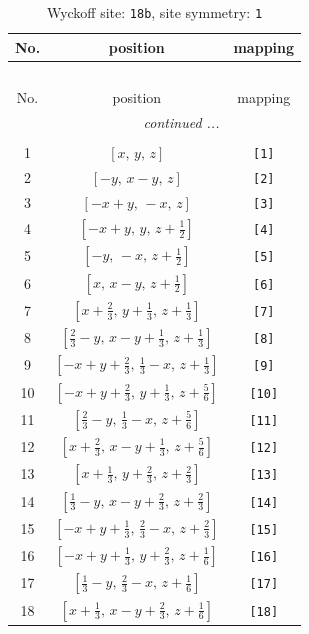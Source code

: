 \documentclass[fleqn,8pt]{jsarticle}
\begin{document}
\begin{longtable}{ccc}
\caption{Wyckoff site: {\tt 18b}, site symmetry: {\tt 1}}
 \\
 \hline \hline
No. & position & mapping \\ \hline \endfirsthead

\multicolumn{2}{l}{\tablename\ \thetable{}} \\
 \hline \hline
No. & position & mapping \\ \hline \endhead

 \hline \hline
\multicolumn{2}{r}{\footnotesize\it continued ...} \\ \endfoot

 \hline \hline
\multicolumn{2}{r}{} \\ \endlastfoot

1 & $\left[ x,\, y,\, z \right]$ & {\tt [1]} \\ \hline
2 & $\left[ - y,\, x - y,\, z \right]$ & {\tt [2]} \\ \hline
3 & $\left[ - x + y,\, - x,\, z \right]$ & {\tt [3]} \\ \hline
4 & $\left[ - x + y,\, y,\, z + \frac{1}{2} \right]$ & {\tt [4]} \\ \hline
5 & $\left[ - y,\, - x,\, z + \frac{1}{2} \right]$ & {\tt [5]} \\ \hline
6 & $\left[ x,\, x - y,\, z + \frac{1}{2} \right]$ & {\tt [6]} \\ \hline
7 & $\left[ x + \frac{2}{3},\, y + \frac{1}{3},\, z + \frac{1}{3} \right]$ & {\tt [7]} \\ \hline
8 & $\left[ \frac{2}{3} - y,\, x - y + \frac{1}{3},\, z + \frac{1}{3} \right]$ & {\tt [8]} \\ \hline
9 & $\left[ - x + y + \frac{2}{3},\, \frac{1}{3} - x,\, z + \frac{1}{3} \right]$ & {\tt [9]} \\ \hline
10 & $\left[ - x + y + \frac{2}{3},\, y + \frac{1}{3},\, z + \frac{5}{6} \right]$ & {\tt [10]} \\ \hline
11 & $\left[ \frac{2}{3} - y,\, \frac{1}{3} - x,\, z + \frac{5}{6} \right]$ & {\tt [11]} \\ \hline
12 & $\left[ x + \frac{2}{3},\, x - y + \frac{1}{3},\, z + \frac{5}{6} \right]$ & {\tt [12]} \\ \hline
13 & $\left[ x + \frac{1}{3},\, y + \frac{2}{3},\, z + \frac{2}{3} \right]$ & {\tt [13]} \\ \hline
14 & $\left[ \frac{1}{3} - y,\, x - y + \frac{2}{3},\, z + \frac{2}{3} \right]$ & {\tt [14]} \\ \hline
15 & $\left[ - x + y + \frac{1}{3},\, \frac{2}{3} - x,\, z + \frac{2}{3} \right]$ & {\tt [15]} \\ \hline
16 & $\left[ - x + y + \frac{1}{3},\, y + \frac{2}{3},\, z + \frac{1}{6} \right]$ & {\tt [16]} \\ \hline
17 & $\left[ \frac{1}{3} - y,\, \frac{2}{3} - x,\, z + \frac{1}{6} \right]$ & {\tt [17]} \\ \hline
18 & $\left[ x + \frac{1}{3},\, x - y + \frac{2}{3},\, z + \frac{1}{6} \right]$ & {\tt [18]} \\
\end{longtable}
\end{document}
